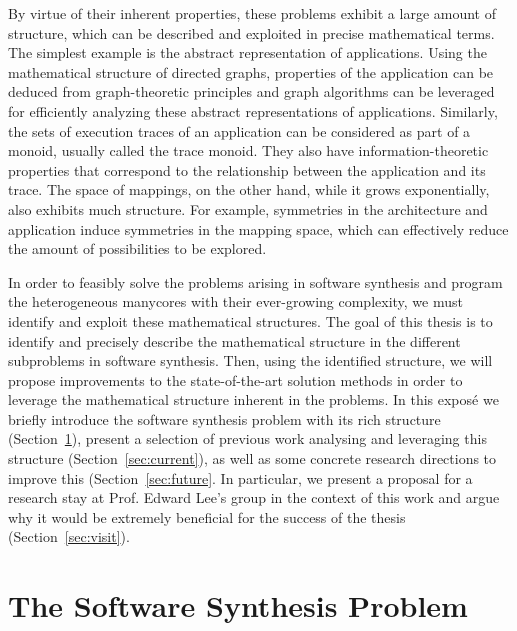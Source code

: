 \documentclass[sigplan,10pt]{acmart}
\begin{document}
By virtue of their inherent properties, these problems exhibit a large amount of structure, which can be described and exploited in precise mathematical terms.
The simplest example is the abstract representation of applications.
Using the mathematical structure of directed graphs, properties of the application can be deduced from graph-theoretic principles and graph algorithms can be leveraged for efficiently analyzing these abstract representations of applications.
Similarly, the sets of execution traces of an application can be considered as part of a monoid, usually called the trace monoid. They also have information-theoretic properties that correspond to the relationship between the application and its trace.
The space of mappings, on the other hand, while it grows exponentially, also exhibits much structure.
For example, symmetries in the architecture and application induce symmetries in the mapping space, which can effectively reduce the amount of possibilities to be explored.

In order to feasibly solve the problems arising in software synthesis and program the heterogeneous manycores with their ever-growing complexity, we must identify and exploit these mathematical structures.
The goal of this thesis is to identify and precisely describe the mathematical structure in the different subproblems in software synthesis.
Then, using the identified structure, we will propose improvements to the state-of-the-art solution methods in order to leverage the mathematical structure inherent in the problems.
In this exposé we briefly introduce the software synthesis problem with its rich structure (Section~\ref{sec:software_synthesis}), present a selection of previous work analysing and leveraging this structure (Section~\ref{sec:current}), as well as some concrete research directions to improve this (Section~\ref{sec:future}.
In particular, we present a proposal for a research stay at Prof. Edward Lee's group in the context of this work and argue why it would be extremely beneficial for the success of the thesis (Section~\ref{sec:visit}).

\section{The Software Synthesis Problem}
\label{sec:software_synthesis}
\end{document}
